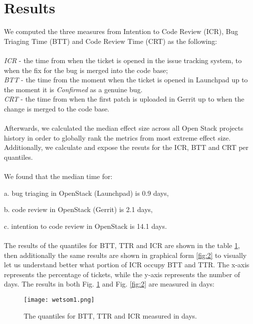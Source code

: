 \documentclass[10pt, conference]{IEEEtran}
\begin{document}
\section{Results}
We computed the three measures from Intention to Code Review (ICR), Bug Triaging Time (BTT) 
and Code Review Time (CRT) as the following: 
\\
\\
\emph{ICR} - the time from when the ticket is opened in the issue tracking system, to 
when the fix for the bug is merged into the code base;
\\
\emph{BTT} - the time from the moment when the ticket is opened in
Launchpad up to the moment it is \emph{Confirmed} as a genuine bug.
\\
\emph{CRT} - the time from when the first patch is uploaded in Gerrit up to when the 
change is merged to the code base.
\\
\\
Afterwards, we calculated the median effect size across all Open Stack projects history 
in order to globally rank the metrics from most extreme effect size.
\\
Additionally, we calculate and expose the resuts for the ICR, BTT and CRT per quantiles.
\\
\\
We found that the median time for: 

a. bug triaging in OpenStack (Launchpad) is 0.9 days,

b. code review in OpenStack (Gerrit) is 2.1 days,

c. intention to code review in OpenStack is 14.1 days. 
\\
\\
The results of the quantiles for BTT, TTR and ICR are shown in the table \ref{fig:1}, then additionally 
the same results are shown in graphical form \ref{fig:2} to visually let us understand better what portion of ICR occupy 
BTT and TTR. The x-axis represents the percentage of tickets, while the y-axis represents the 
number of days. The results in both Fig. \ref{fig:1} and Fig. \ref{fig:2} are measured in days:

\begin{figure}[H]
\centering

\texttt{[image: wetsom1.png]}

\caption{The quantiles for BTT, TTR and ICR measured in days.}
\label{fig:1}
\end{figure}
\end{document}
